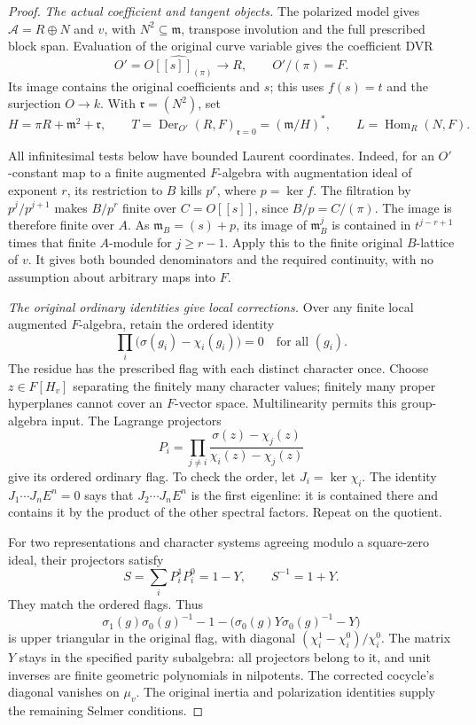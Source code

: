 \begin{proof}
\emph{The actual coefficient and tangent objects.}
The polarized model gives \(\mathcal A=R\oplus N\) and \(v\),
with \(N^2\subseteq\mathfrak m\), transpose involution and the full
prescribed block span.  Evaluation of the original curve variable
gives the coefficient DVR
\[
 O'=\widehat{O[[s]]_{(\pi)}}\longrightarrow R,
 \qquad O'/(\pi)=F.
\]
Its image contains the original coefficients and \(s\); this uses
\(f(s)=t\) and the surjection \(O\to k\).
With \(\mathfrak r=(N^2)\), set
\[
 H=\pi R+\mathfrak m^2+\mathfrak r,\qquad
 T=\operatorname{Der}_{O'}(R,F)_{\mathfrak r=0}
       =(\mathfrak m/H)^*,\qquad
 L=\operatorname{Hom}_R(N,F).
\]

All infinitesimal tests below have bounded Laurent coordinates.
Indeed, for an \(O'\)-constant map to a finite augmented \(F\)-algebra
with augmentation ideal of exponent \(r\), its restriction to \(B\)
kills \(p^r\), where \(p=\ker f\).  The filtration by \(p^j/p^{j+1}\)
makes \(B/p^r\) finite over \(C=O[[s]]\), since \(B/p=C/(\pi)\).
The image is therefore finite over \(A\).  As
\(\mathfrak m_B=(s)+p\), its image of \(\mathfrak m_B^j\) is
contained in \(t^{j-r+1}\) times that finite \(A\)-module for
\(j\geq r-1\).  Apply this to the finite original \(B\)-lattice
of \(v\).  It gives both bounded denominators and the required
continuity, with no assumption about arbitrary maps into \(F\).

\emph{The original ordinary identities give local corrections.}
Over any finite local augmented \(F\)-algebra, retain the ordered
identity
\[
 \prod_i\bigl(\sigma(g_i)-\chi_i(g_i)\bigr)=0
                              \quad\text{for all }(g_i).
\]
The residue has the prescribed flag with each distinct character
once.  Choose \(z\in F[H_v]\) separating the finitely many character
values; finitely many proper hyperplanes cannot cover an
\(F\)-vector space.  Multilinearity permits this group-algebra input.
The Lagrange projectors
\[
 P_i=\prod_{j\ne i}
      \frac{\sigma(z)-\chi_j(z)}{\chi_i(z)-\chi_j(z)}
\]
give its ordered ordinary flag.  To check the order, let
\(J_i=\ker\chi_i\).  The identity \(J_1\cdots J_nE^n=0\)
says that \(J_2\cdots J_nE^n\) is the first eigenline: it is
contained there and contains it by the product of the other
spectral factors.  Repeat on the quotient.

For two representations and character systems agreeing modulo a
square-zero ideal, their projectors satisfy
\[
 S=\sum_iP_i^1P_i^0=1-Y,\qquad S^{-1}=1+Y.
\]
They match the ordered flags.  Thus
\[
 \sigma_1(g)\sigma_0(g)^{-1}-1
       -\bigl(\sigma_0(g)Y\sigma_0(g)^{-1}-Y\bigr)
\]
is upper triangular in the original flag, with diagonal
\((\chi_i^1-\chi_i^0)/\chi_i^0\).  The matrix \(Y\) stays in the
specified parity subalgebra: all projectors belong to it, and unit
inverses are finite geometric polynomials in nilpotents.  The corrected
cocycle's diagonal vanishes on \(\mu_v\).  The original inertia and polarization
identities supply the remaining Selmer conditions.


\end{proof}
